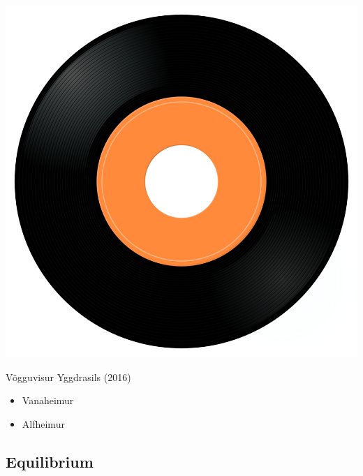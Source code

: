 \begin{minipage}[t]{0.25\textwidth}
\captionsetup{type=figure}
\includegraphics[width=\textwidth]{Images/cover.png}
\caption*{Vögguvisur Yggdrasils (2016)}
\end{minipage}
\begin{minipage}[t]{0.25\textwidth}\vspace{0pt}
\begin{itemize}[nosep,leftmargin=1em,labelwidth=*,align=left]
	\setlength{\itemsep}{0pt}
	\item Vanaheimur
	\item Alfheimur
\end{itemize}
\end{minipage}

\subsection{Equilibrium}

